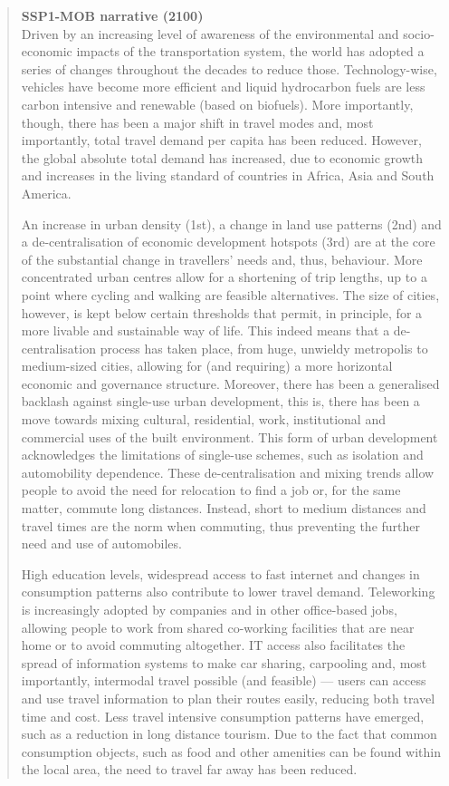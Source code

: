 \blockquote{\sffamily \textbf{SSP1-MOB narrative (2100)}\\Driven by an increasing level of awareness of the environmental and socio-economic impacts of the transportation system, the world has adopted a series of changes throughout the decades to reduce those. Technology-wise, vehicles have become more efficient and liquid hydrocarbon fuels are less carbon intensive and renewable (based on biofuels). More importantly, though, there has been a major shift in travel modes and, most importantly, total travel demand per capita has been reduced. However, the global absolute total demand has increased, due to economic growth and increases in the living standard of countries in Africa, Asia and South America.

An increase in urban density (1st), a change in land use patterns (2nd) and a de-centralisation of economic development hotspots (3rd) are at the core of the substantial change in travellers' needs and, thus, behaviour. More concentrated urban centres allow for a shortening of trip lengths, up to a point where cycling and walking are feasible alternatives. The size of cities, however, is kept below certain thresholds that permit, in principle, for a more livable and sustainable way of life. This indeed means that a de-centralisation process has taken place, from huge, unwieldy metropolis to medium-sized cities, allowing for (and requiring) a more horizontal economic and governance structure. Moreover, there has been a generalised backlash against single-use urban development, this is, there has been a move towards mixing cultural, residential, work, institutional and commercial uses of the built environment. This form of urban development acknowledges the limitations of single-use schemes, such as isolation and automobility dependence. These de-centralisation and mixing trends allow people to avoid the need for relocation to find a job or, for the same matter, commute long distances. Instead, short to medium distances and travel times are the norm when commuting, thus preventing the further need and use of automobiles.

High education levels, widespread access to fast internet and changes in consumption patterns also contribute to lower travel demand. Teleworking is increasingly adopted by companies and in other office-based jobs, allowing people to work from shared co-working facilities that are near home or to avoid commuting altogether. IT access also facilitates the spread of information systems to make car sharing, carpooling and, most importantly, intermodal travel possible (and feasible) --- users can access and use travel information to plan their routes easily, reducing both travel time and cost. Less travel intensive consumption patterns have emerged, such as a reduction in long distance tourism. Due to the fact that common consumption objects, such as food and other amenities can be found within the local area, the need to travel far away has been reduced.

}
